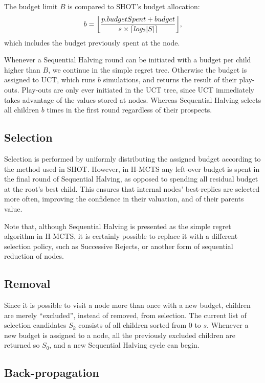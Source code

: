 \documentclass{kecsmstr}
\DeclarePairedDelimiter{\ceil}{\lceil}{\rceil}
\DeclarePairedDelimiter{\floor}{\lfloor}{\rfloor}
\begin{document}
The budget limit $B$ is compared to SHOT's budget allocation:
\begin{equation}
	b = \floor[\bigg]{\frac{p.budgetSpent + budget}{s\times\ceil{log_2{|S|}}}},
\end{equation}
which includes the budget previously spent at the node.

Whenever a Sequential Halving round can be initiated with a budget per child higher than $B$, we continue in the simple regret tree. Otherwise the budget is assigned to UCT, which runs $b$ simulations, and returns the result of their play-outs. Play-outs are only ever initiated in the UCT tree, since UCT immediately takes advantage of the values stored at nodes. Whereas Sequential Halving selects all children $b$ times in the first round regardless of their prospects. 

\subsection{Selection}
Selection is performed by uniformly distributing the assigned budget according to the method used in SHOT. However, in H-MCTS any left-over budget is spent in the final round of Sequential Halving, as opposed to spending all residual budget at the root's best child. This ensures that internal nodes' best-replies are selected more often, improving the confidence in their valuation, and of their parents value.

Note that, although Sequential Halving is presented as the simple regret algorithm in H-MCTS, it is certainly possible to replace it with a different selection policy, such as Successive Rejects, or another form of sequential reduction of nodes.

\subsection{Removal}
Since it is possible to visit a node more than once with a new budget, children are merely ``excluded'', instead of removed, from selection. The current list of selection candidates $S_k$ consists of all children sorted from 0 to $s$. Whenever a new budget is assigned to a node, all the previously excluded children are returned so $S_0$, and a new Sequential Halving cycle can begin.

\subsection{Back-propagation}
\end{document}
